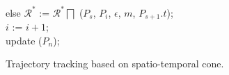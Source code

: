 \begin{figure}[tb!]
\begin{center}
{\begin{minipage}{3.3in}
{						\icc \>\hspace{3ex} else $\mathcal{R}^*$ := $\mathcal{R}^*\bigsqcap$ ($P_s$, $P_{i}$, $\epsilon$, $m$, $P_{s+1}.t$); \\
						\icc \>\hspace{3ex} $i$ := $i +1$;	\\
						\icc \>\hspace{0ex} update ($P_{n}$); 
					}
					\vspace{-2ex}
					\myhrule
				\end{minipage}
			}
		\end{center}
		\vspace{-1ex}
		\caption{\small Trajectory tracking based on spatio-temporal cone.}
		\label{alg:citt-s-full}
		\vspace{-1ex}
	\end{figure}


